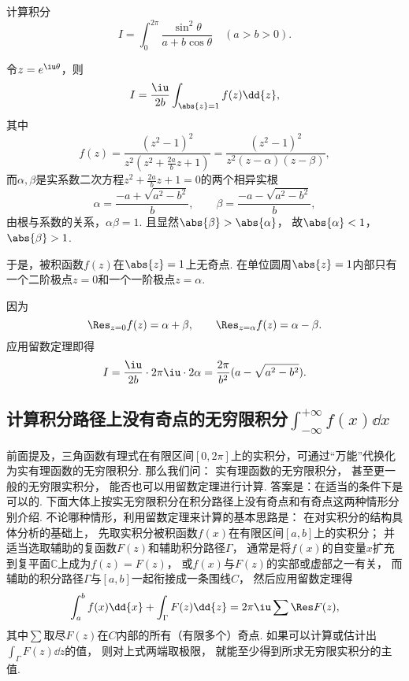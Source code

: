 \begin{example}
计算积分\begin{equation*}
	I = \int_0^{2\pi} \frac{\sin^2 \theta}{a+b\cos\theta} \quad(a>b>0).
\end{equation*}
\begin{solution}
令\(z=e^{\iu\theta}\)，则\begin{equation*}
	I = \frac{\iu}{2b} \int_{\abs{z}=1} f(z) \dd{z},
\end{equation*}
其中\begin{equation*}
	f(z) = \frac{(z^2-1)^2}{z^2 \left(z^2+\frac{2a}{b}z+1\right)}
	= \frac{(z^2-1)^2}{z^2(z-\alpha)(z-\beta)},
\end{equation*}
而\(\alpha,\beta\)是实系数二次方程\(z^2+\frac{2a}{b}z+1=0\)的两个相异实根\begin{equation*}
	\alpha=\frac{-a+\sqrt{a^2-b^2}}{b},
	\qquad
	\beta=\frac{-a-\sqrt{a^2-b^2}}{b},
\end{equation*}
由根与系数的关系，\(\alpha\beta=1\).
且显然\(\abs{\beta}>\abs{\alpha}\)，
故\(\abs{\alpha}<1\)，
\(\abs{\beta}>1\).

于是，被积函数\(f(z)\)在\(\abs{z}=1\)上无奇点.
在单位圆周\(\abs{z}=1\)内部只有一个二阶极点\(z=0\)和一个一阶极点\(z=\alpha\).

因为\begin{equation*}
	\Res_{z=0} f(z) = \alpha+\beta,
	\qquad
	\Res_{z=\alpha} f(z) = \alpha-\beta.
\end{equation*}
应用留数定理即得\begin{equation*}
	I = \frac{\iu}{2b} \cdot 2\pi\iu \cdot 2\alpha
	= \frac{2\pi}{b^2} (a-\sqrt{a^2-b^2}).
\end{equation*}
\end{solution}
\end{example}

\subsection{计算积分路径上没有奇点的无穷限积分\texorpdfstring{\(\int_{-\infty}^{+\infty} f(x) \dd{x}\)}{}}
前面提及，三角函数有理式在有限区间\([0,2\pi]\)上的实积分，可通过“万能”代换化为实有理函数的无穷限积分.
那么我们问：
实有理函数的无穷限积分，
甚至更一般的无穷限实积分，
能否也可以用留数定理进行计算.
答案是：在适当的条件下是可以的.
下面大体上按实无穷限积分在积分路径上没有奇点和有奇点这两种情形分别介绍.
不论哪种情形，利用留数定理来计算的基本思路是：
在对实积分的结构具体分析的基础上，
先取实积分被积函数\(f(x)\)在有限区间\([a,b]\)上的实积分；
并适当选取辅助的复函数\(F(z)\)和辅助积分路径\(\Gamma\)，
通常是将\(f(x)\)的自变量\(x\)扩充到复平面\(\mathbb{C}\)上成为\(f(z)=F(z)\)，
或\(f(x)\)与\(F(z)\)的实部或虚部之一有关，
而辅助的积分路径\(\Gamma\)与\([a,b]\)一起衔接成一条围线\(C\)，
然后应用留数定理得\begin{equation}
	\int_a^b f(x) \dd{x}
	+ \int_\Gamma F(z) \dd{z}
	= 2\pi\iu \sum \Res F(z),
\end{equation}
其中\(\sum\)取尽\(F(z)\)在\(C\)内部的所有（有限多个）奇点.
如果可以计算或估计出\(\int_\Gamma F(z) \dd{z}\)的值，
则对上式两端取极限，
就能至少得到所求无穷限实积分的主值.

